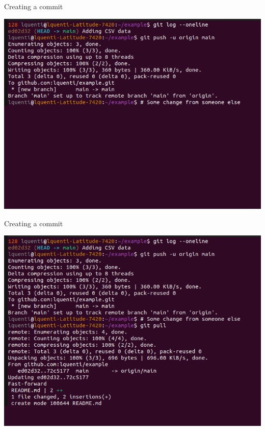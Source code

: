 \documentclass[compress,aspectratio=169]{beamer}
\begin{document}
  \begin{frame}[noframenumbering]{Creating a commit}
    \begin{center}
      \includegraphics[height=0.85\textheight]{./assets/terminal_slideshows/03_Push_Pull_03.png}
    \end{center}
  \end{frame}
  \begin{frame}[noframenumbering]{Creating a commit}
    \begin{center}
      \includegraphics[height=0.85\textheight]{./assets/terminal_slideshows/03_Push_Pull_04.png}
    \end{center}
  \end{frame}
\end{document}
